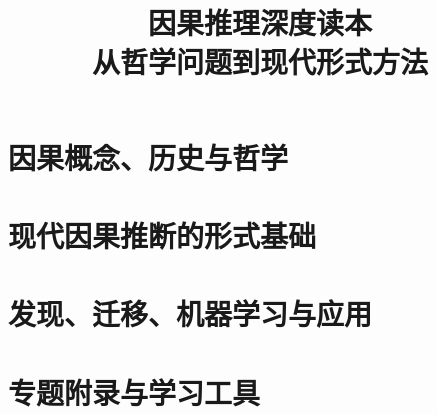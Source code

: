 \documentclass[UTF8,fontset=fandol,openany,11pt]{ctexbook}
\title{因果推理深度读本\\\large 从哲学问题到现代形式方法}
\author{}
\date{}
\begin{document}
\frontmatter
\maketitle


\tableofcontents

\mainmatter

\part{因果概念、历史与哲学}




\part{现代因果推断的形式基础}





\part{发现、迁移、机器学习与应用}






\appendix
\part{专题附录与学习工具}





\backmatter
\printbibliography[heading=bibintoc,title=参考文献]
\cleardoublepage
{}
{}
\renewcommand{\indexname}{主题索引}
\printindex
\end{document}
